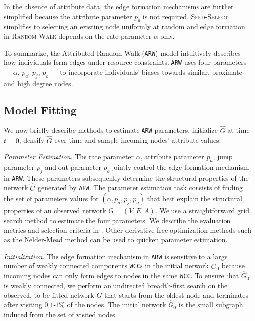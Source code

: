 In the absence of attribute data, the edge formation mechanisms are further simplified
because the attribute parameter $p_a$ is not required. \textsc{Seed-Select} simplifies
to selecting an existing node uniformly at random and edge formation in \textsc{Random-Walk}
depends on the rate parameter $\alpha$ only.

To summarize, the Attributed Random Walk (\texttt{ARW}) model
intuitively describes how individuals form edges under resource constraints.
\texttt{ARW} uses four parameters --- $\alpha$, $p_a$, $p_j$, $p_o$ --- to incorporate
individuals' biases towards similar, proximate and high degree nodes.

\subsection{Model Fitting}
\label{sub:Model Fitting}
We now briefly describe methods to estimate \texttt{ARW} parameters,
initialize $\hat{G}$ at time ${t=0}$, densify $\hat{G}$
over time and sample incoming nodes' attribute values.

\textit{Parameter Estimation}.
The rate parameter $\alpha$, attribute parameter $p_a$, jump parameter $p_j$ and
out parameter $p_o$ jointly control the edge formation mechanism in \texttt{ARW}.
These parameters subsequently determine the structural properties of the network $\hat{G}$
generated by \texttt{ARW}. The parameter estimation task consists of finding the set of
parameters values for $(\alpha, p_a, p_j, p_o)$ that best explain the structural properties
of an observed network $G=(V,E,A)$. We use a straightforward grid search method to estimate
the four parameters. We describe the evaluation metrics and selection criteria in .
Other derivative-free optimization methods such as the Nelder-Mead method can be used to quicken parameter estimation.

\textit{Initialization}. The edge formation mechanism in \texttt{ARW} is
sensitive to a large number of weakly connected components \texttt{WCC}s in the
initial network $\hat{G}_0$ because incoming nodes can only form edges to nodes
in the same \texttt{WCC}. To ensure that $\hat{G}_0$ is weakly
connected, we perform an undirected breadth-first search on the observed,
to-be-fitted network $G$ that starts from the oldest node and terminates after
visiting $0.1$-$1\%$ of the nodes. The initial network $\hat{G}_0$ is the small
subgraph induced from the set of visited nodes.

